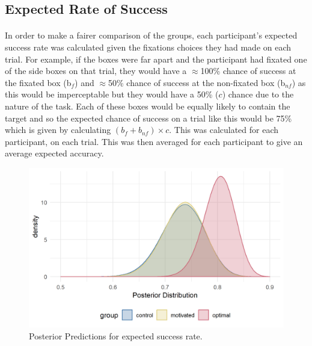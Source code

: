 \documentclass[12pt]{article}
\begin{document}
\subsection*{Expected Rate of Success}
\paragraph{} In order to make a fairer comparison of the groups, each participant's expected success rate was calculated given the fixations choices they had made on each trial. For example, if the boxes were far apart and the participant had fixated one of the side boxes on that trial, they would have a $\approx$100\% chance of success at the fixated box (b$_f$) and $\approx$50\% chance of success at the non-fixated box (b$_{nf}$) as this would be imperceptable but they would have a 50\% ($c$) chance due to the nature of the task. Each of these boxes would be equally likely to contain the target and so the expected chance of success on a trial like this would be 75\% which is given by calculating $(b_f + b_{nf})\times c$. This was calculated for each participant, on each trial. This was then averaged for each participant to give an average expected accuracy. 

\begin{figure}[ht!]
	\includegraphics[scale=1]{../Figures/Model_stan_expacc.png}
	\centering
	\captionsetup{justification=centering}
	\caption{Posterior Predictions for expected success rate.}
	\label{fig:Model_exp_acc}
\end{figure}
\end{document}
